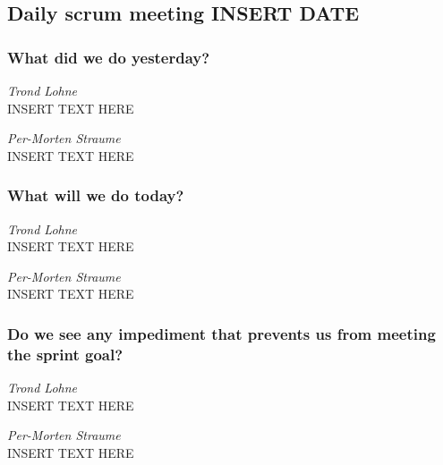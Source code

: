 \begin{center}
\subsection*{Daily scrum meeting INSERT DATE}
\end{center}
\bigskip


\subsubsection*{What did we do yesterday?}

\noindent\textit{Trond Lohne}\\
INSERT TEXT HERE

\medskip

\noindent\textit{Per-Morten Straume}\\
INSERT TEXT HERE


\subsubsection*{What will we do today?}

\noindent\textit{Trond Lohne}\\
INSERT TEXT HERE

\medskip

\noindent\textit{Per-Morten Straume}\\
INSERT TEXT HERE


\subsubsection*{Do we see any impediment that prevents us from meeting the sprint goal?}

\noindent\textit{Trond Lohne}\\
INSERT TEXT HERE

\medskip

\noindent\textit{Per-Morten Straume}\\
INSERT TEXT HERE


\newpage